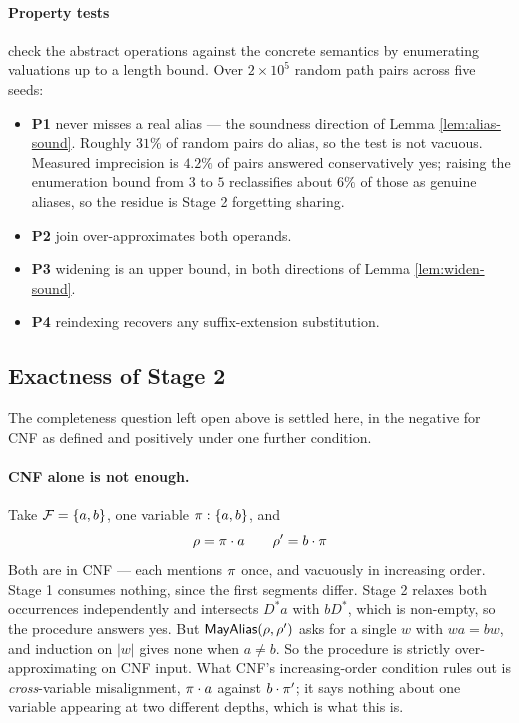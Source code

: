 \paragraph{Property tests} check the abstract operations against the concrete
semantics by enumerating valuations up to a length bound.  Over $2\times10^{5}$
random path pairs across five seeds:
\begin{itemize}
\item \textbf{P1} \MayAlias{} never misses a real alias --- the soundness
  direction of Lemma \ref{lem:alias-sound}.  Roughly $31\%$ of random pairs do
  alias, so the test is not vacuous.  Measured imprecision is $4.2\%$ of pairs
  answered conservatively \textsf{yes}; raising the enumeration bound from $3$
  to $5$ reclassifies about $6\%$ of those as genuine aliases, so the residue is
  Stage 2 forgetting sharing.
\item \textbf{P2} join over-approximates both operands.
\item \textbf{P3} widening is an upper bound, in both directions of Lemma
  \ref{lem:widen-sound}.
\item \textbf{P4} reindexing recovers any suffix-extension substitution.
\end{itemize}

\subsection{Exactness of Stage 2}
\label{sec:pathfrag-exact}

The completeness question left open above is settled here, in the negative for
CNF as defined and positively under one further condition.

\paragraph{CNF alone is not enough.}  Take $\mathcal{F} = \{a,b\}$, one variable
$\pi : \{a,b\}$, and
\[\rho = \pi\cdot a \qquad \rho' = b\cdot\pi\]
Both are in CNF --- each mentions $\pi$ once, and vacuously in increasing
order.  Stage 1 consumes nothing, since the first segments differ.  Stage 2
relaxes both occurrences independently and intersects $D^{*}a$ with $bD^{*}$,
which is non-empty, so the procedure answers \textsf{yes}.  But
$\textsf{MayAlias}(\rho,\rho')$ asks for a single $w$ with $wa = bw$, and induction on
$|w|$ gives none when $a \neq b$.  So the procedure is strictly
over-approximating on CNF input.  What CNF's increasing-order condition rules
out is \emph{cross}-variable misalignment, $\pi\cdot a$ against
$b\cdot\pi'$; it says nothing about one variable appearing at two different
depths, which is what this is.

